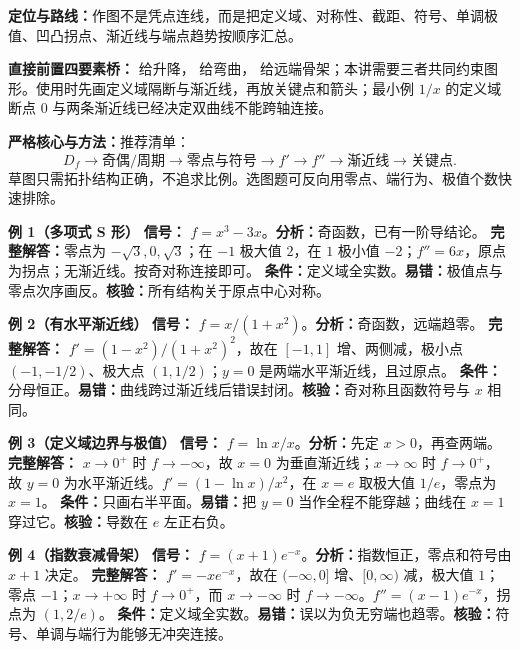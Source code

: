 \begin{knowledgeBox}
\textbf{定位与路线：}作图不是凭点连线，而是把定义域、对称性、截距、符号、单调极值、凹凸拐点、渐近线与端点趋势按顺序汇总。

\textbf{直接前置四要素桥：} 给升降， 给弯曲， 给远端骨架；本讲需要三者共同约束图形。使用时先画定义域隔断与渐近线，再放关键点和箭头；最小例 \(1/x\) 的定义域断点 \(0\) 与两条渐近线已经决定双曲线不能跨轴连接。

\textbf{严格核心与方法：}推荐清单：
\[
D_f\to\text{奇偶/周期}\to\text{零点与符号}\to f'\to f''\to\text{渐近线}\to\text{关键点}.
\]
草图只需拓扑结构正确，不追求比例。选图题可反向用零点、端行为、极值个数快速排除。

\textbf{例 1（多项式 S 形）}\quad
\textbf{信号：} \(f=x^3-3x\)。\textbf{分析：}奇函数，已有一阶导结论。
\textbf{完整解答：}零点为 \(-\sqrt3,0,\sqrt3\)；在 \(-1\) 极大值 \(2\)，在 \(1\) 极小值 \(-2\)；\(f''=6x\)，原点为拐点；无渐近线。按奇对称连接即可。
\textbf{条件：}定义域全实数。\textbf{易错：}极值点与零点次序画反。\textbf{核验：}所有结构关于原点中心对称。

\textbf{例 2（有水平渐近线）}\quad
\textbf{信号：} \(f=x/(1+x^2)\)。\textbf{分析：}奇函数，远端趋零。
\textbf{完整解答：} \(f'=(1-x^2)/(1+x^2)^2\)，故在 \([-1,1]\) 增、两侧减，极小点 \((-1,-1/2)\)、极大点 \((1,1/2)\)；\(y=0\) 是两端水平渐近线，且过原点。
\textbf{条件：}分母恒正。\textbf{易错：}曲线跨过渐近线后错误封闭。\textbf{核验：}奇对称且函数符号与 \(x\) 相同。

\textbf{例 3（定义域边界与极值）}\quad
\textbf{信号：} \(f=\ln x/x\)。\textbf{分析：}先定 \(x>0\)，再查两端。
\textbf{完整解答：} \(x\to0^+\) 时 \(f\to-\infty\)，故 \(x=0\) 为垂直渐近线；\(x\to\infty\) 时 \(f\to0^+\)，故 \(y=0\) 为水平渐近线。\(f'=(1-\ln x)/x^2\)，在 \(x=e\) 取极大值 \(1/e\)，零点为 \(x=1\)。
\textbf{条件：}只画右半平面。\textbf{易错：}把 \(y=0\) 当作全程不能穿越；曲线在 \(x=1\) 穿过它。\textbf{核验：}导数在 \(e\) 左正右负。

\textbf{例 4（指数衰减骨架）}\quad
\textbf{信号：} \(f=(x+1)e^{-x}\)。\textbf{分析：}指数恒正，零点和符号由 \(x+1\) 决定。
\textbf{完整解答：} \(f'= -xe^{-x}\)，故在 \((-\infty,0]\) 增、\([0,\infty)\) 减，极大值 \(1\)；零点 \(-1\)；\(x\to+\infty\) 时 \(f\to0^+\)，而 \(x\to-\infty\) 时 \(f\to-\infty\)。\(f''=(x-1)e^{-x}\)，拐点为 \((1,2/e)\)。
\textbf{条件：}定义域全实数。\textbf{易错：}误以为负无穷端也趋零。\textbf{核验：}符号、单调与端行为能够无冲突连接。


\end{knowledgeBox}
